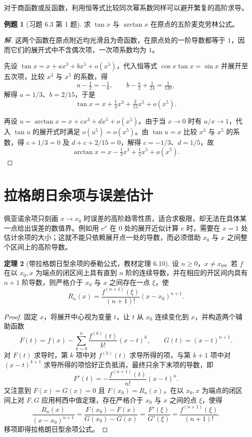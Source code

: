 \documentclass[UTF8,fontset=fandol,a4paper,12pt]{ctexart}
\theoremstyle{definition}
\newtheorem{theorem}{定理}[section]
\newtheorem{example}[theorem]{例题}
\begin{document}
对于商函数或反函数，利用恒等式比较同次幂系数同样可以避开繁复的高阶求导。

\begin{example}[习题 6.3 第 1 题]
求 $\tan x$ 与 $\arctan x$ 在原点的五阶麦克劳林公式。
\end{example}

\begin{proof}[解]
这两个函数在原点附近均光滑且为奇函数，在原点处的一阶导数都等于 $1$，因而它们的展开式中不含偶次项，一次项系数均为 $1$。

先设 $\tan x=x+ax^3+bx^5+o(x^5)$，代入恒等式 $\cos x\tan x=\sin x$ 并展开至五次项，比较 $x^3$ 与 $x^5$ 的系数，得
\[
 a-\tfrac12=-\tfrac16,\qquad b-\tfrac a2+\tfrac1{24}=\tfrac1{120},
\]
解得 $a=1/3$、$b=2/15$，于是
\[
 \tan x=x+\tfrac13x^3+\tfrac{2}{15}x^5+o(x^5).
\]

再设 $u=\arctan x=x+cx^3+dx^5+o(x^5)$。由于当 $x\to0$ 时有 $u/x\to1$，代入 $\tan u$ 的展开式时满足 $o(u^5)=o(x^5)$。由 $\tan u=x$ 比较 $x^3$ 与 $x^5$ 的系数，得 $c+1/3=0$ 及 $d+c+2/15=0$，解得 $c=-1/3$、$d=1/5$，故
\[
 \arctan x=x-\tfrac13x^3+\tfrac15x^5+o(x^5).
\]
\end{proof}

\section{拉格朗日余项与误差估计}
佩亚诺余项只刻画 $x\to x_0$ 时误差的高阶趋零性质，适合求极限，却无法在具体某一点给出误差的数值界。例如用 $e^x$ 在 $0$ 处的展开近似计算 $e$ 时，需要在 $x=1$ 处估计余项的大小；这就不能只依赖展开点一处的导数，而必须借助 $x_0$ 与 $x$ 之间整个区间上的高阶导数。

\begin{theorem}[带拉格朗日型余项的泰勒公式，教材定理 6.10]
设 $n\ge0$，$x\ne x_0$。若 $f$ 在以 $x_0,x$ 为端点的闭区间上具有直到 $n$ 阶的连续导数，并在相应的开区间内具有 $n+1$ 阶导数，则严格介于 $x_0$ 与 $x$ 之间存在一点 $\xi$，使
\[
 R_n(x)=\frac{f^{(n+1)}(\xi)}{(n+1)!}(x-x_0)^{n+1}.
\]
\end{theorem}

\begin{proof}
固定 $x$，将展开中心视为变量 $t$，让 $t$ 从 $x_0$ 连续变化到 $x$，并构造两个辅助函数
\[
 F(t)=f(x)-\sum_{k=0}^n\frac{f^{(k)}(t)}{k!}(x-t)^k,\qquad G(t)=(x-t)^{n+1}.
\]
对 $F(t)$ 求导时，第 $k$ 项中对 $f^{(k)}(t)$ 求导所得的项，与第 $k+1$ 项中对 $(x-t)^{k+1}$ 求导所得的项恰好正负抵消，最终只余下末项的导数，即
\[
 F'(t)=-\frac{f^{(n+1)}(t)}{n!}(x-t)^n.
\]
又注意到 $F(x)=G(x)=0$ 且 $F(x_0)=R_n(x)$，在以 $x_0,x$ 为端点的闭区间上对 $F,G$ 应用柯西中值定理，存在严格介于 $x_0$ 与 $x$ 之间的点 $\xi$，使得
\[
 \frac{R_n(x)}{(x-x_0)^{n+1}}
 =\frac{F(x_0)-F(x)}{G(x_0)-G(x)}
 =\frac{F'(\xi)}{G'(\xi)}
 =\frac{f^{(n+1)}(\xi)}{(n+1)!}.
\]
移项即得拉格朗日型余项公式。
\end{proof}
\end{document}
